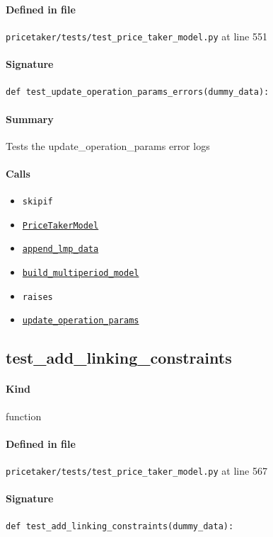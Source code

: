 \documentclass[11pt]{report}
\begin{document}
\paragraph{Defined in file} \texttt{pricetaker/tests/test\_price\_taker\_model.py} at line 551
\paragraph{Signature} \texttt{def test\_update\_operation\_params\_errors(dummy\_data):}
\paragraph{Summary} Tests the update\_operation\_params error logs
\paragraph{Calls}
\begin{itemize}[leftmargin=*]
  \item \texttt{skipif}
  \item \hyperref[def:pricetaker-price_taker_model.py:PriceTakerModel:L161]{\texttt{PriceTakerModel}}
  \item \hyperref[def:pricetaker-price_taker_model.py:PriceTakerModel.append_lmp_data:L221]{\texttt{append\_lmp\_data}}
  \item \hyperref[def:pricetaker-price_taker_model.py:PriceTakerModel.build_multiperiod_model:L291]{\texttt{build\_multiperiod\_model}}
  \item \texttt{raises}
  \item \hyperref[def:pricetaker-price_taker_model.py:PriceTakerModel.update_operation_params:L530]{\texttt{update\_operation\_params}}
\end{itemize}
\subsection{test\_add\_linking\_constraints}
\label{def:pricetaker-tests-test_price_taker_model.py:test_add_linking_constraints:L567}
\paragraph{Kind} function
\paragraph{Defined in file} \texttt{pricetaker/tests/test\_price\_taker\_model.py} at line 567
\paragraph{Signature} \texttt{def test\_add\_linking\_constraints(dummy\_data):}
\end{document}
